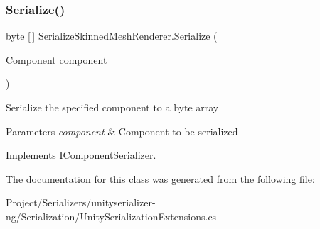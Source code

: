 \mbox{\label{class_serialize_skinned_mesh_renderer_a5537c5f2cab4580a75bd8f6ef3ef331d}} 
\subsubsection{\texorpdfstring{Serialize()}{Serialize()}}
{\footnotesize\ttfamily byte \mbox{[}$\,$\mbox{]} Serialize\+Skinned\+Mesh\+Renderer.\+Serialize (\begin{DoxyParamCaption}\item[{Component}]{component }\end{DoxyParamCaption})\hspace{0.3cm}{\ttfamily [inline]}}



Serialize the specified component to a byte array 


\begin{DoxyParams}{Parameters}
{\em component} & Component to be serialized \\
\hline
\end{DoxyParams}


Implements \hyperlink{interface_i_component_serializer_ab2aa38005665496b62d6c54b5f0dbd31}{I\+Component\+Serializer}.



The documentation for this class was generated from the following file\+:\begin{DoxyCompactItemize}
\item 
Project/\+Serializers/unityserializer-\/ng/\+Serialization/Unity\+Serialization\+Extensions.\+cs\end{DoxyCompactItemize}

